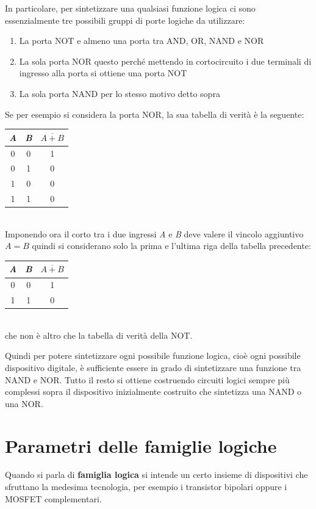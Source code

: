 \documentclass[12pt, a4paper]{report}
\begin{document}
In particolare, per sintetizzare una qualsiasi funzione logica ci sono essenzialmente tre possibili gruppi di porte logiche da utilizzare:
\begin{enumerate}
    \item La porta NOT e almeno una porta tra AND, OR, NAND e NOR
    \item La sola porta NOR questo perché mettendo in cortocircuito i due terminali di ingresso alla porta si ottiene una porta NOT
    \item La sola porta NAND per lo stesso motivo detto sopra
\end{enumerate}
Se per esempio si considera la porta NOR, la sua tabella di verità è la seguente:
\begin{table}[ht]
        \centering
        \begin{tabular}{c c |c}
        \em A &\em B &$\overline{A + B}$\\\hline
        0 &0 &1\\
        0 &1 &0\\
        1 &0 &0\\
        1 &1 &0
        \end{tabular}
    \end{table}
\\Imponendo ora il corto tra i due ingressi \textit{A} e \textit{B} deve valere il vincolo aggiuntivo $A = B$ quindi si considerano solo la prima e l'ultima riga della tabella precedente:
\begin{table}[ht]
        \centering
        \begin{tabular}{c c |c}
        \em A &\em B &$\overline{A + B}$\\\hline
        0 &0 &1\\
        1 &1 &0
        \end{tabular}
\end{table}
\\che non è altro che la tabella di verità della NOT.

Quindi per potere sintetizzare ogni possibile funzione logica, cioè ogni possibile dispositivo digitale, è sufficiente essere in grado di sintetizzare una funzione tra NAND e NOR. Tutto il resto si ottiene costruendo circuiti logici sempre più complessi sopra il dispositivo inizialmente costruito che sintetizza una NAND o una NOR.

\section{Parametri delle famiglie logiche}
Quando si parla di \textbf{famiglia logica} si intende un certo insieme di dispositivi che sfruttano la medesima tecnologia, per esempio i transistor bipolari oppure i MOSFET complementari.
\end{document}
